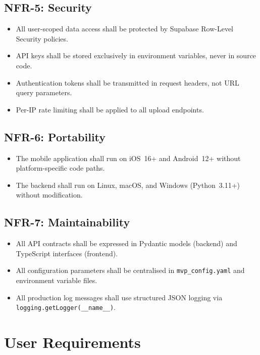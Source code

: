 \subsection{NFR-5: Security}
\begin{itemize}
  \item All user-scoped data access shall be protected by Supabase Row-Level Security policies.
  \item API keys shall be stored exclusively in environment variables, never in source code.
  \item Authentication tokens shall be transmitted in request headers, not URL query parameters.
  \item Per-IP rate limiting shall be applied to all upload endpoints.
\end{itemize}

\subsection{NFR-6: Portability}
\begin{itemize}
  \item The mobile application shall run on iOS~16+ and Android~12+ without platform-specific code paths.
  \item The backend shall run on Linux, macOS, and Windows (Python~3.11+) without modification.
\end{itemize}

\subsection{NFR-7: Maintainability}
\begin{itemize}
  \item All API contracts shall be expressed in Pydantic models (backend) and TypeScript interfaces (frontend).
  \item All configuration parameters shall be centralised in \lstinline|mvp_config.yaml| and environment variable files.
  \item All production log messages shall use structured JSON logging via \lstinline|logging.getLogger(__name__)|.
\end{itemize}

\section{User Requirements}
\label{sec:user_requirements}

